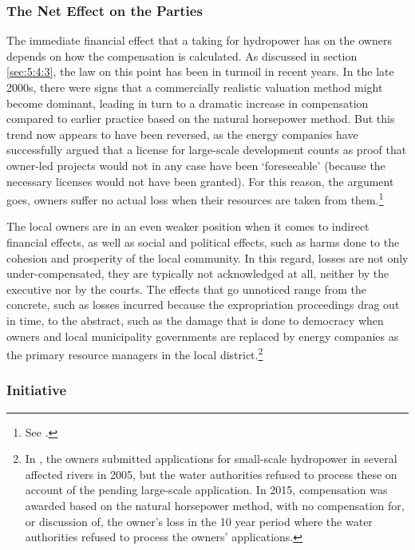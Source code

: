 \subsubsection{The Net Effect on the Parties}\label{sec:5:7:2}

The immediate financial effect that a taking for hydropower has on the owners depends on how the compensation is calculated. As discussed in section \ref{sec:5:4:3}, the law on this point has been in turmoil in recent years. In the late 2000s, there were signs that a commercially realistic valuation method might become dominant, leading in turn to a dramatic increase in compensation compared to earlier practice based on the natural horsepower method. But this trend now appears to have been reversed, as the energy companies have successfully argued that a license for large-scale development counts as proof that owner-led projects would not in any case have been `foreseeable' (because the necessary licenses would not have been granted). For this reason, the argument goes, owners suffer no actual loss when their resources are taken from them.\footnote{See \cite{otra13}.}

The local owners are in an even weaker position when it comes to indirect financial effects, as well as social and political effects, such as harms done to the cohesion and prosperity of the local community. In this regard, losses are not only under-compensated, they are typically not acknowledged at all, neither by the executive nor by the courts. The effects that go unnoticed range from the concrete, such as losses incurred because the expropriation proceedings drag out in time, to the abstract, such as the damage that is done to democracy when owners and local municipality governments are replaced by energy companies as the primary resource managers in the local district.\footnote{In \cite{smibelg15}, the owners submitted applications for small-scale hydropower in several affected rivers in 2005, but the water authorities refused to process these on account of the pending large-scale application. In 2015, compensation was awarded based on the natural horsepower method, with no compensation for, or discussion of, the owner's loss in the 10 year period where the water authorities refused to process the owners' applications.}

\subsubsection{Initiative}\label{sec:5:7:3}

